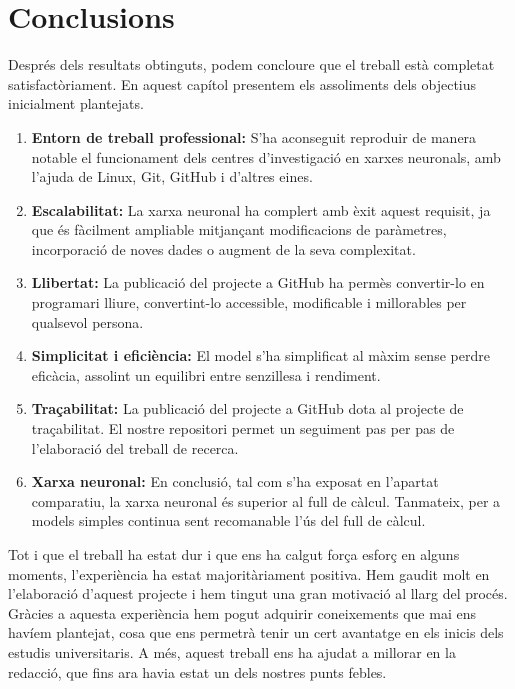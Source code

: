 \chapter{Conclusions}

\label{c:conclusions}

Després dels resultats obtinguts, podem concloure que el treball està completat satisfactòriament. En aquest capítol presentem els assoliments dels objectius inicialment plantejats.

\begin{enumerate}

     \item \textbf{Entorn de treball professional:} S’ha aconseguit reproduir de manera notable el funcionament dels centres d’investigació en xarxes neuronals, amb l'ajuda de Linux, Git, GitHub i d'altres eines.

     \item \textbf{Escalabilitat:} La xarxa neuronal ha complert amb èxit aquest requisit, ja que és fàcilment ampliable mitjançant modificacions de paràmetres, incorporació de noves dades o augment de la seva complexitat.

     \item \textbf{Llibertat:} La publicació del projecte a GitHub ha permès convertir-lo en programari lliure, convertint-lo accessible, modificable i millorables per qualsevol persona.

     \item \textbf{Simplicitat i eficiència:} El model s’ha simplificat al màxim sense perdre eficàcia, assolint un equilibri entre senzillesa i rendiment.

     \item \textbf{Traçabilitat:} La publicació del projecte a GitHub dota al projecte de traçabilitat. El nostre repositori permet un seguiment pas per pas de l'elaboració del treball de recerca.

     \item \textbf{Xarxa neuronal:} En conclusió, tal com s’ha exposat en l’apartat comparatiu, la xarxa neuronal és superior al full de càlcul. Tanmateix, per a models simples continua sent recomanable l’ús del full de càlcul.

\end{enumerate}

Tot i que el treball ha estat dur i que ens ha calgut força esforç en alguns moments, l’experiència ha estat majoritàriament positiva. Hem gaudit molt en l’elaboració d’aquest projecte i hem tingut una gran motivació al llarg del procés. Gràcies a aquesta experiència hem pogut adquirir coneixements que mai ens havíem plantejat, cosa que ens permetrà tenir un cert avantatge en els inicis dels estudis universitaris. A més, aquest treball ens ha ajudat a millorar en la redacció, que fins ara havia estat un dels nostres punts febles.

